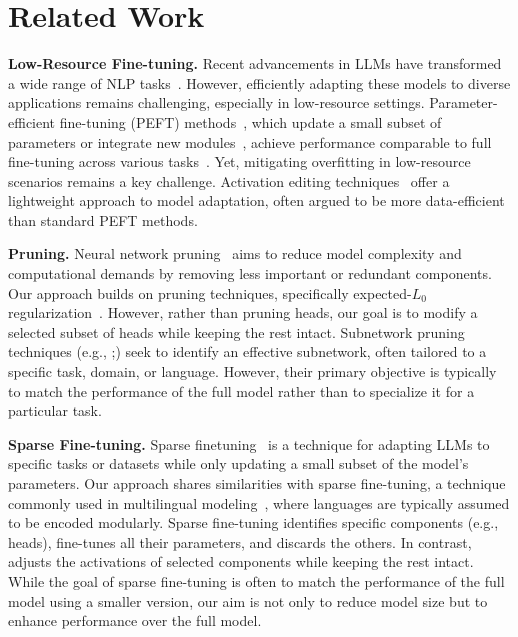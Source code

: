 \section{Related Work}
\label{sec:related_work}
\noindent\textbf{Low-Resource Fine-tuning.}
Recent advancements in LLMs have transformed a wide range of NLP tasks~\cite{zhao2023survey}. However, efficiently adapting these models to diverse applications remains challenging, especially in low-resource settings. Parameter-efficient fine-tuning (PEFT) methods~\cite{hu2021lora,dettmers2024qlora}, which update a small subset of parameters or integrate new modules~\cite{houlsby2019parameter}, achieve performance comparable to full fine-tuning across various tasks~\cite{wang2024parameter}. Yet, mitigating overfitting in low-resource scenarios remains a key challenge. Activation editing techniques~\cite{ben-zaken-etal-2022-bitfit,wu-etal-2024-advancing,wu2024reft,yin2024lofit} offer a lightweight approach to model adaptation, often argued to be more data-efficient than standard PEFT methods.

\noindent\textbf{Pruning.}
Neural network pruning~\cite{chengneuralpruning2024} aims to reduce model complexity and computational demands by removing less important or redundant components. Our approach builds on pruning techniques, specifically expected-$L_0$ regularization~\cite{louizos2018learning}. However, rather than pruning heads, our goal is to modify a selected subset of heads while keeping the rest intact.  Subnetwork pruning techniques (e.g., \citealp{frantar2023sparsegpt};\citealp{sun2023simple}) seek to identify an effective subnetwork, often tailored to a specific task, domain, or language. However, their primary objective is typically to match the performance of the full model rather than to specialize it for a particular task.

\noindent\textbf{Sparse Fine-tuning.}
Sparse finetuning~\cite{dao2022monarch,thangarasa2023spdf} is a technique for adapting LLMs to specific tasks or datasets while only updating a small subset of the model's parameters.
Our approach shares similarities with sparse fine-tuning, a technique commonly used in multilingual modeling~\cite{nooralahzadeh2023improving,choenni-etal-2024-examining}, where languages are typically assumed to be encoded modularly. Sparse fine-tuning identifies specific components (e.g., heads), fine-tunes all their parameters, and discards the others.
In contrast, \jola{} adjusts the activations of selected components while keeping the rest intact.
While the goal of sparse fine-tuning is often to match the performance of the full model using a smaller version, our aim is not only to reduce model size but to enhance performance over the full model.